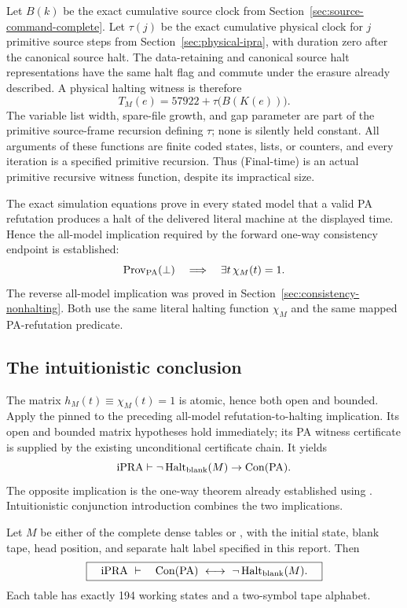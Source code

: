 Let $B(k)$ be the exact cumulative source clock from
Section~\ref{sec:source-command-complete}.  Let $\tau(j)$ be the exact
cumulative physical clock for $j$ primitive source steps from
Section~\ref{sec:physical-ipra}, with duration zero after the canonical
source halt.  The data-retaining and canonical source halt
representations have the same halt flag and commute under the erasure
already described.  A physical halting witness is therefore
\[
 T_M(e)=57922+\tau\bigl(B(K(e))\bigr).                 \tag{Final-time}
\]
The variable list width, spare-file growth, and gap parameter are part of
the primitive source-frame recursion defining $\tau$; none is silently
held constant.  All arguments of these functions are finite coded
states, lists, or counters, and every iteration is a specified primitive
recursion.  Thus (Final-time) is an actual primitive recursive witness
function, despite its impractical size.

The exact simulation equations prove in every stated model that a valid
PA refutation produces a halt of the delivered literal machine at the
displayed time.  Hence the all-model implication required by the forward
one-way consistency endpoint is established:
\[
 \operatorname{Prov}_{\mathrm{PA}}(\bot)
 \quad\Longrightarrow\quad \exists t\,\chi_M(t)=1.
\]
The reverse all-model implication was proved in
Section~\ref{sec:consistency-nonhalting}.  Both use the same literal
halting function $\chi_M$ and the same mapped PA-refutation predicate.

\subsection{The intuitionistic conclusion}

The matrix $h_M(t)\equiv\chi_M(t)=1$ is atomic, hence both open and
bounded.  Apply the pinned
to the preceding all-model refutation-to-halting implication.
Its open and bounded matrix hypotheses hold immediately; its PA witness
certificate is supplied by the existing unconditional certificate chain.
It yields
\[
 \mathrm{iPRA}\vdash
       \neg\operatorname{Halt}_{\rm blank}(M)\to\operatorname{Con}(\mathrm{PA}).
\]
The opposite implication is the one-way theorem already established
using .  Intuitionistic
conjunction introduction combines the two implications\cite{one-way-transfer}.

\begin{theorem}
Let $M$ be either of the complete dense tables
 or
, with the initial state, blank
tape, head position, and separate halt label specified in this report.
Then
\[
 \boxed{\quad\mathrm{iPRA}\ \vdash\quad
       \Con(\PA)\ \longleftrightarrow\
                     \neg\operatorname{Halt}_{\rm blank}(M).\quad}
\]
Each table has exactly 194 working states and a two-symbol tape alphabet.
\end{theorem}

